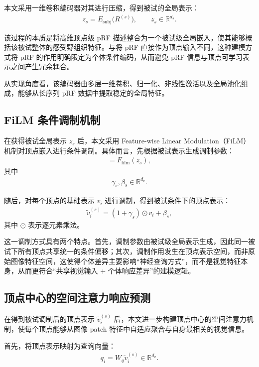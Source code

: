 本文采用一维卷积编码器对其进行压缩，得到被试的全局表示：
\begin{align}
  z_s = E_{\mathrm{subj}}\bigl(R^{(s)}\bigr), \qquad z_s \in \mathbb{R}^{d_s}.
\end{align}

该过程的本质是将高维顶点级 pRF 描述整合为一个被试级全局嵌入，使其能够概括该被试整体的感受野组织特征。与将 pRF 直接作为顶点输入不同，这种建模方式将 pRF 的作用明确限定为个体条件编码，从而避免 pRF 信息与顶点可学习表示之间产生冗余耦合。

从实现角度看，该编码器由多层一维卷积、归一化、非线性激活以及全局池化组成，能够从长序列 pRF 数据中提取稳定的全局特征。

\subsection{FiLM 条件调制机制}

在获得被试全局表示 $z_s$ 后，本文采用 Feature-wise Linear Modulation（FiLM）机制对顶点嵌入进行条件调制。具体而言，先根据被试表示生成调制参数：
\begin{align}
  [\gamma_s, \beta_s] = F_{\mathrm{film}}(z_s),
\end{align}
其中
\begin{align}
  \gamma_s, \beta_s \in \mathbb{R}^{d_v}.
\end{align}

随后，对每个顶点的基础表示 $v_i$ 进行调制，得到被试条件下的顶点表示：
\begin{align}
  \tilde{v}_i^{(s)} = (1 + \gamma_s) \odot v_i + \beta_s,
\end{align}
其中 $\odot$ 表示逐元素乘法。

这一调制方式具有两个特点。首先，调制参数由被试级全局表示生成，因此同一被试下所有顶点共享统一的条件偏移；其次，调制作用发生在顶点表示空间，而非原始图像特征空间，这使得个体差异主要影响“神经查询方式”，而不是视觉特征本身，从而更符合“共享视觉输入 + 个体响应差异”的建模逻辑。

\subsection{顶点中心的空间注意力响应预测}

在得到被试调制后的顶点表示 $\tilde{v}_i^{(s)}$ 后，本文进一步构建顶点中心的空间注意力机制，使每个顶点能够从图像 patch 特征中自适应聚合与自身最相关的视觉信息。

首先，将顶点表示映射为查询向量：
\begin{align}
  q_i = W_q \tilde{v}_i^{(s)} \in \mathbb{R}^{d_v}.
\end{align}

